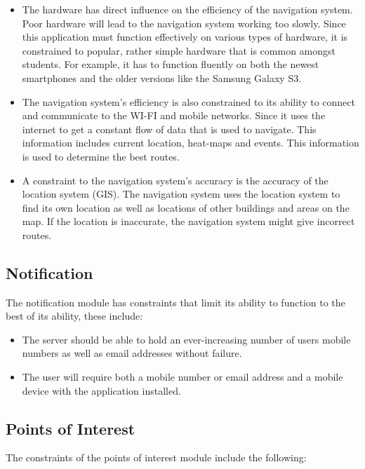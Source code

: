 \documentclass[runningheads,a4paper]{article}
\begin{document}
\begin{itemize}
\item The hardware has direct influence on the efficiency of the navigation system. Poor hardware will lead to the navigation system working too slowly. Since this application must function effectively on various types of hardware, it is constrained to popular, rather simple hardware that is common amongst students. For example, it has to function fluently on both the newest smartphones and the older versions like the Samsung Galaxy S3.

\item The navigation system’s efficiency is also constrained to its ability to connect and communicate to the WI-FI and mobile networks. Since it uses the internet to get a constant flow of data that is used to navigate. This information includes current location, heat-maps and events. This information is used to determine the best routes.

\item A constraint to the navigation system’s accuracy is the accuracy of the location system (GIS). The navigation system uses the location system to find its own location as well as locations of other buildings and areas on the map. If the location is inaccurate, the navigation system might give incorrect routes. 

\end{itemize}

\subsection{Notification}
The notification module has constraints that limit its ability to function to the best of its ability, these include:

\begin{itemize}
\item The server should be able to hold an ever-increasing number of users mobile numbers as well as email addresses without failure.  

\item The user will require both a mobile number or email address and a mobile device with the application installed.
\end{itemize}

\subsection{Points of Interest}
The constraints of the points of interest module include the following:
\end{document}
